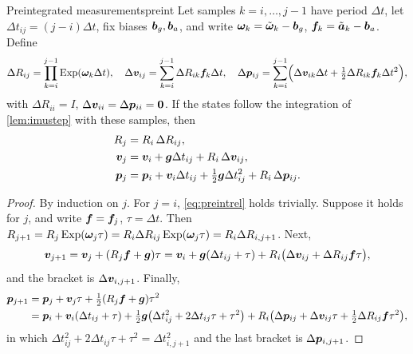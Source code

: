 \begin{theorem}{Preintegrated measurements}{preint}
Let samples $k=i,\dots,j-1$ have period $\Delta t$, let $\Delta t_{ij}=
(j-i)\Delta t$, fix biases $\bm{b}_g,\bm{b}_a$, and write
$\bm{\omega}_k=\tilde{\bm{\omega}}_k-\bm{b}_g$, $\bm{f}_k=\tilde{\bm{a}}_k-
\bm{b}_a$. Define
\begin{equation}\label{eq:preint}
\Delta R_{ij}=\prod_{k=i}^{j-1}\operatorname{Exp}(\bm{\omega}_k\Delta t),\quad
\Delta\bm{v}_{ij}=\sum_{k=i}^{j-1}\Delta R_{ik}\bm{f}_k\Delta t,\quad
\Delta\bm{p}_{ij}=\sum_{k=i}^{j-1}\Bigl(\Delta\bm{v}_{ik}\Delta t+
\tfrac12\Delta R_{ik}\bm{f}_k\Delta t^2\Bigr),
\end{equation}
with $\Delta R_{ii}=I$, $\Delta\bm{v}_{ii}=\Delta\bm{p}_{ii}=\bm{0}$.
If the states follow the integration of \cref{lem:imustep} with these
samples, then
\begin{equation}\label{eq:preintrel}
\begin{aligned}
R_j&=R_i\,\Delta R_{ij},\\
\bm{v}_j&=\bm{v}_i+\bm{g}\Delta t_{ij}+R_i\,\Delta\bm{v}_{ij},\\
\bm{p}_j&=\bm{p}_i+\bm{v}_i\Delta t_{ij}+\tfrac12\bm{g}\Delta t_{ij}^2+
R_i\,\Delta\bm{p}_{ij}.
\end{aligned}
\end{equation}
\end{theorem}

\begin{proof}
By induction on $j$. For $j=i$, \eqref{eq:preintrel} holds trivially.
Suppose it holds for $j$, and write $\bm{f}=\bm{f}_j$, $\tau=\Delta t$.
Then $R_{j+1}=R_j\operatorname{Exp}(\bm{\omega}_j\tau)=R_i\Delta R_{ij}\operatorname{Exp}(\bm{\omega}_j\tau)
=R_i\Delta R_{i,j+1}$. Next,
\[
\bm{v}_{j+1}=\bm{v}_j+(R_j\bm{f}+\bm{g})\tau
=\bm{v}_i+\bm{g}(\Delta t_{ij}+\tau)+R_i\bigl(\Delta\bm{v}_{ij}+
\Delta R_{ij}\bm{f}\tau\bigr),
\]
and the bracket is $\Delta\bm{v}_{i,j+1}$. Finally,
\[
\begin{aligned}
\bm{p}_{j+1}&=\bm{p}_j+\bm{v}_j\tau+\tfrac12(R_j\bm{f}+\bm{g})\tau^2\\
&=\bm{p}_i+\bm{v}_i(\Delta t_{ij}+\tau)
+\tfrac12\bm{g}\bigl(\Delta t_{ij}^2+2\Delta t_{ij}\tau+\tau^2\bigr)
+R_i\bigl(\Delta\bm{p}_{ij}+\Delta\bm{v}_{ij}\tau+\tfrac12\Delta R_{ij}
\bm{f}\tau^2\bigr),
\end{aligned}
\]
in which $\Delta t_{ij}^2+2\Delta t_{ij}\tau+\tau^2=\Delta t_{i,j+1}^2$
and the last bracket is $\Delta\bm{p}_{i,j+1}$.
\end{proof}

